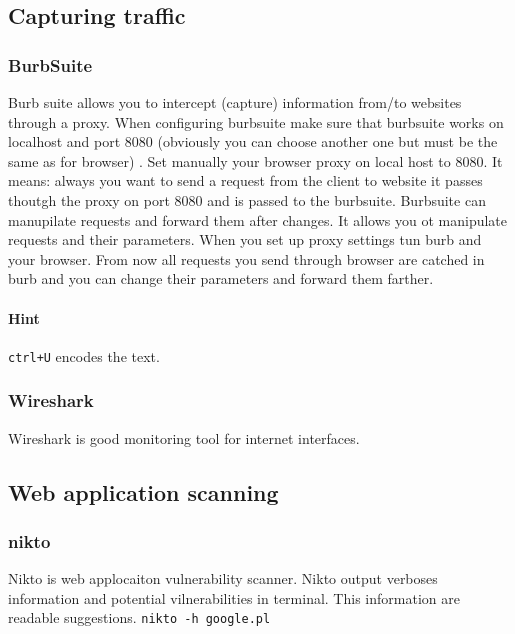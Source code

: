 \documentclass{article}[12pt]
\begin{document}
\subsection{Capturing traffic}
\subsubsection{BurbSuite}

Burb suite allows you to intercept (capture) information from/to websites through a proxy. When configuring burbsuite make sure that burbsuite works on localhost and port 8080 (obviously you can choose another one but must be the same as for browser) . Set manually your browser proxy on local host to 8080.
It means: always you want to send a request from the client to website it passes thoutgh the proxy on port 8080 and is passed to the burbsuite. Burbsuite can manupilate requests and forward them after changes. It allows you ot manipulate
requests and their parameters. When you set up proxy settings tun burb and your browser. From now all requests you send through browser  are catched in burb and you can change their parameters and forward them farther.

\paragraph{Hint} \texttt{ctrl+U} encodes the text.

\subsubsection{Wireshark}
Wireshark is good monitoring tool for internet interfaces.


\subsection{Web application scanning}
\subsubsection*{nikto}
Nikto is web applocaiton vulnerability scanner. Nikto output verboses information and potential vilnerabilities in terminal. This information are readable suggestions.
\newline
\texttt{nikto -h google.pl}
\end{document}
